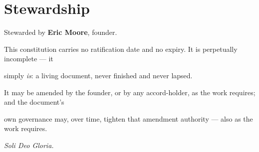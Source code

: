 \documentclass[11pt]{article}
\begin{document}
\clearpage
\section*{Stewardship}


Stewarded by \textbf{Eric Moore}, founder.


This constitution carries no ratification date and no expiry. It is perpetually incomplete — it

simply \textit{is}: a living document, never finished and never lapsed.


It may be amended by the founder, or by any accord-holder, as the work requires; and the document's

own governance may, over time, tighten that amendment authority — also as the work requires.



\textit{Soli Deo Gloria.}
\end{document}
